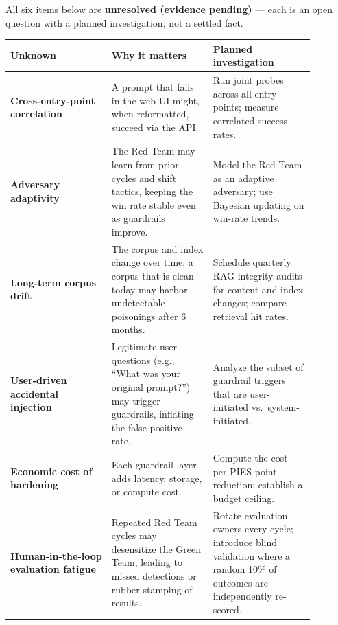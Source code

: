 \label{what-we-still-dont-know}


All six items below are \textbf{unresolved (evidence pending)} --- each
is an open question with a planned investigation, not a settled fact.

\nopagebreak[4]
\begin{longtable}[]{@{}
  >{\raggedright\arraybackslash}p{0.2927\linewidth}
  >{\raggedright\arraybackslash}p{0.2927\linewidth}
  >{\raggedright\arraybackslash}p{0.2927\linewidth}@{}}
\toprule\noalign{}
\begin{minipage}[b]{\linewidth}\raggedright
Unknown
\end{minipage} & \begin{minipage}[b]{\linewidth}\raggedright
Why it matters
\end{minipage} & \begin{minipage}[b]{\linewidth}\raggedright
Planned investigation
\end{minipage} \\
\midrule\noalign{}
\endhead
\bottomrule\noalign{}
\endlastfoot
\textbf{Cross-entry-point correlation} & A prompt that fails in the web
UI might, when reformatted, succeed via the API. & Run joint probes
across all entry points; measure correlated success rates. \\
\noalign{\label{tab:24.5}}
\textbf{Adversary adaptivity} & The Red Team may learn from prior cycles
and shift tactics, keeping the win rate stable even as guardrails
improve. & Model the Red Team as an adaptive adversary; use Bayesian
updating on win-rate trends. \\
\textbf{Long-term corpus drift} & The corpus and index change over time;
a corpus that is clean today may harbor undetectable poisonings after 6
months. & Schedule quarterly RAG integrity audits for content and index
changes; compare retrieval hit rates. \\
\textbf{User-driven accidental injection} & Legitimate user questions
(e.g., ``What was your original prompt?'') may trigger guardrails,
inflating the false-positive rate. & Analyze the subset of guardrail
triggers that are user-initiated vs.~system-initiated. \\
\textbf{Economic cost of hardening} & Each guardrail layer adds latency,
storage, or compute cost. & Compute the cost-per-PIES-point reduction;
establish a budget ceiling. \\
\textbf{Human-in-the-loop evaluation fatigue} & Repeated Red Team cycles
may desensitize the Green Team, leading to missed detections or
rubber-stamping of results. & Rotate evaluation owners every cycle;
introduce blind validation where a random 10\% of outcomes are
independently re-scored. \\
\end{longtable}


